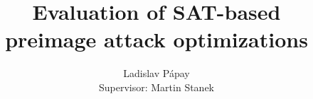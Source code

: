 \documentclass[myposter,portrait]{sciposter}
\begin{document}
\setlength{\logowidth}{20cm}
\setlength{\titlewidth}{\textwidth}
\addtolength{\titlewidth}{-\logowidth}
\useleftlogofalse

\color{textCol}

\title{Evaluation of SAT-based\\ preimage attack optimizations}
\author{Ladislav P\'apay\\
        Supervisor: Martin Stanek}
\maketitle

\end{document}
